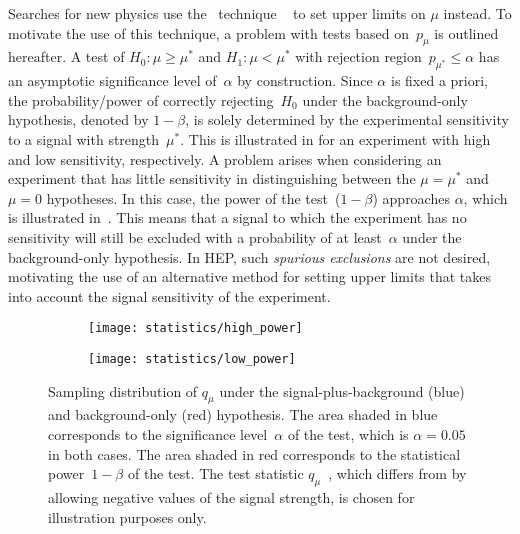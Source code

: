 Searches for new physics use the \CLs~technique
~\cite{Junk:1999kv,Read:2000ru,Read:2002hq} to set upper limits on $\mu$
instead. To motivate the use of this technique, a problem with tests based
on~$p_\mu$ is outlined hereafter. A test of $H_0: \mu \geq \mu^*$ and
$H_1: \mu < \mu^*$ with rejection region~$p_{\mu^*} \leq \alpha$ has an
asymptotic significance level of~$\alpha$ by construction.
Since $\alpha$ is fixed a priori, the probability/power of correctly
rejecting~$H_0$ under the background-only hypothesis, denoted by $1 - \beta$, is
solely determined by the experimental sensitivity to a signal with
strength~$\mu^*$. This is illustrated in
 for an experiment with high
and low sensitivity, respectively. A problem arises when considering an
experiment that has little sensitivity in distinguishing between the
$\mu = \mu^*$ and $\mu = 0$ hypotheses. In this case, the power of the
test~($1 - \beta$) approaches $\alpha$, which is illustrated
in~. This means that a signal to which the experiment
has no sensitivity will still be excluded with a probability of at
least~$\alpha$ under the background-only hypothesis. In HEP, such \emph{spurious
  exclusions} are not desired, motivating the use of an alternative method for
setting upper limits that takes into account the signal sensitivity of the
experiment.

\begin{figure}[htbp]
  \centering

  \begin{subfigure}{0.46\textwidth}
    \texttt{[image: statistics/high\_power]}
    \label{fig:cls_qmu_highpower}
  \end{subfigure}\hfill%
  \begin{subfigure}{0.46\textwidth}
    \texttt{[image: statistics/low\_power]}
    \label{fig:cls_qmu_lowpower}
  \end{subfigure}

  \caption[Sampling distribution of the test statistic for upper limits under
  the signal-plus-background and background-only hypothesis.]{Sampling
    distribution of $q_{\mu}$ under the signal-plus-background (blue) and
    background-only (red) hypothesis. The area shaded in blue corresponds to the
    significance level~$\alpha$ of the test, which is $\alpha = 0.05$ in both
    cases. The area shaded in red corresponds to the statistical
    power~$1 - \beta$ of the test. The test statistic
    $q_{\mu}$~\cite{Cowan:2010js}, which differs from \qmutilde by allowing
    negative values of the signal strength, is chosen for illustration purposes
    only.}%
  \label{fig:cls_qmu}
\end{figure}

